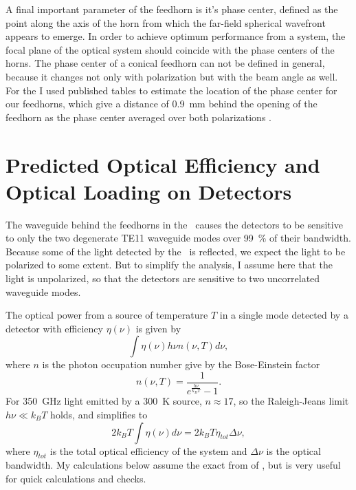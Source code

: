 A final important parameter of the feedhorn is it's phase center, defined as the point along the axis of the horn from which the far-field spherical wavefront appears to emerge.
In order to achieve optimum performance from a system, the focal plane of the optical system should coincide with the phase centers of the horns.
The phase center of a conical feedhorn can not be defined in general, because it changes not only with polarization but with the beam angle as well.
For the \Imager I used published tables to estimate the location of the phase center for our feedhorns, which give a distance of \SI{0.9}{\mm} behind the opening of the feedhorn as the phase center averaged over both polarizations \cite[Page~353]{thomas_a._milligan_modern_2005}.

\section{Predicted Optical Efficiency and Optical Loading on Detectors} \label{sec:ch4-opt-eff}

The waveguide behind the feedhorns in the \Imager\ causes the detectors to be sensitive to only the two degenerate TE11 waveguide modes over \SI{99}{\percent} of their bandwidth.
Because some of the light detected by the \Imager\ is reflected, we expect the light to be polarized to some extent.
But to simplify the analysis, I assume here that the light is unpolarized, so that the detectors are sensitive to two uncorrelated waveguide modes.

The optical power from a source of temperature $T$ in a single mode detected by a detector with efficiency $\eta(\nu)$ is given by \cite{zmuidzinas_thermal_2003}
\begin{equation} \label{eqn:ch4-power-per-mode}
  \int \eta(\nu) h \nu n(\nu,T) d \nu ,
\end{equation}
where $n$ is the photon occupation number give by the Bose-Einstein factor
\begin{equation} \label{eqn:ch4-photon-n}
  n(\nu,T) = \frac{1}{e^{\frac{h \nu}{k_B T}} -1}.
\end{equation}
For \SI{350}{\GHz} light emitted by a \SI{300}{\K} source, $n \approx 17$, so the Raleigh-Jeans limit $h \nu \ll k_B T$ holds, and  simplifies to
\begin{equation} \label{eqn:ch4-power-per-mode-rj}
  2 k_B T \int \eta(\nu) d \nu = 2 k_B T \eta_{tot} \Delta \nu,
\end{equation}
where $\eta_{tot}$ is the total optical efficiency of the system and $\Delta \nu$ is the optical bandwidth.
My calculations below assume the exact from of , but  is very useful for quick calculations and checks.

